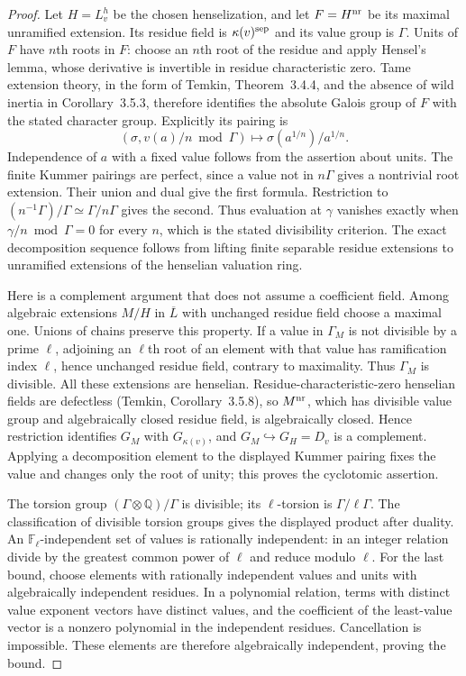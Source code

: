 \begin{proof}
Let $H=L_v^h$ be the chosen henselization, and let $F=H^{\rm nr}$
be its maximal unramified extension.  Its residue field is
$\kappa(v)^{\rm sep}$ and its value group is $\Gamma$.  Units of
$F$ have $n$th roots in $F$: choose an $n$th root of the residue and
apply Hensel's lemma, whose derivative is invertible in residue
characteristic zero.  Tame extension theory, in the form of Temkin,
Theorem~3.4.4, and the absence of wild inertia in Corollary~3.5.3,
therefore identifies the absolute Galois group of $F$ with the stated
character group.  Explicitly its pairing is
\[
 (\sigma,v(a)/n\bmod\Gamma)\longmapsto
 \sigma(a^{1/n})/a^{1/n}.
\]
Independence of $a$ with a fixed value follows from the assertion about
units.  The finite Kummer pairings are perfect, since a value not in
$n\Gamma$ gives a nontrivial root extension.  Their union and dual
give the first formula.  Restriction to
$(n^{-1}\Gamma)/\Gamma\simeq\Gamma/n\Gamma$ gives the second.
Thus evaluation at $\gamma$ vanishes exactly when
$\gamma/n\bmod\Gamma=0$ for every $n$, which is the stated
divisibility criterion.  The exact decomposition sequence follows
from lifting finite separable residue extensions to unramified
extensions of the henselian valuation ring.

Here is a complement argument that does not assume a coefficient
field.  Among algebraic extensions $M/H$ in $\overline L$ with
unchanged residue field choose a maximal one.  Unions of chains
preserve this property.  If a value in $\Gamma_M$ is not divisible by
a prime $\ell$, adjoining an $\ell$th root of an element with that
value has ramification index $\ell$, hence unchanged residue field,
contrary to maximality.  Thus $\Gamma_M$ is divisible.  All these
extensions are henselian.  Residue-characteristic-zero henselian
fields are defectless (Temkin, Corollary~3.5.8), so $M^{\rm nr}$,
which has divisible value group and algebraically closed residue
field, is algebraically closed.  Hence restriction identifies
$G_M$ with $G_{\kappa(v)}$, and $G_M\hookrightarrow G_H=D_v$
is a complement.  Applying a decomposition element to the displayed
Kummer pairing fixes the value and changes only the root of unity;
this proves the cyclotomic assertion.

The torsion group $(\Gamma\otimes\mathbb Q)/\Gamma$ is divisible;
its $\ell$-torsion is $\Gamma/\ell\Gamma$.  The classification of
divisible torsion groups gives the displayed product after duality.
An $\mathbb F_\ell$-independent set of values is rationally
independent: in an integer relation divide by the greatest common
power of $\ell$ and reduce modulo $\ell$.  For the last bound,
choose elements with rationally independent values and units with
algebraically independent residues.  In a polynomial relation, terms
with distinct value exponent vectors have distinct values, and the
coefficient of the least-value vector is a nonzero polynomial in the
independent residues.  Cancellation is impossible.  These elements
are therefore algebraically independent, proving the bound.
\end{proof}

